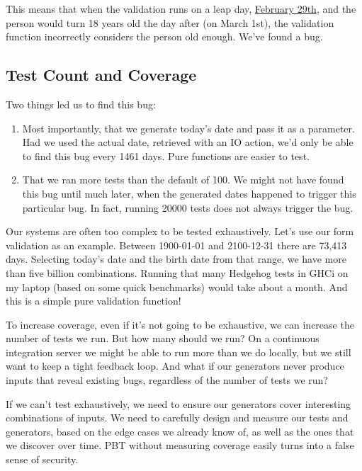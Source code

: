 This means that when the validation runs on a leap day,
\href{https://en.wikipedia.org/wiki/February_29\#Born_on_February_29}{February
29th}, and the person would turn 18 years old the day after (on March
1st), the validation function incorrectly considers the person old
enough. We've found a bug.

\subsection{Test Count and Coverage}\label{test-count-and-coverage}

Two things led us to find this bug:

\begin{enumerate}
\item
  Most importantly, that we generate today's date and pass it as a
  parameter. Had we used the actual date, retrieved with an IO action,
  we'd only be able to find this bug every 1461 days. Pure functions are
  easier to test.
\item
  That we ran more tests than the default of 100. We might not have
  found this bug until much later, when the generated dates happened to
  trigger this particular bug. In fact, running 20000 tests does not
  always trigger the bug.
\end{enumerate}
Our systems are often too complex to be tested exhaustively. Let's use
our form validation as an example. Between 1900-01-01 and 2100-12-31
there are 73,413 days. Selecting today's date and the birth date from
that range, we have more than five billion combinations. Running that
many Hedgehog tests in GHCi on my laptop (based on some quick
benchmarks) would take about a month. And this is a simple pure
validation function!

To increase coverage, even if it's not going to be exhaustive, we can
increase the number of tests we run. But how many should we run? On a
continuous integration server we might be able to run more than we do
locally, but we still want to keep a tight feedback loop. And what if
our generators never produce inputs that reveal existing bugs,
regardless of the number of tests we run?

If we can't test exhaustively, we need to ensure our generators cover
interesting combinations of inputs. We need to carefully design and
measure our tests and generators, based on the edge cases we already
know of, as well as the ones that we discover over time. PBT without
measuring coverage easily turns into a false sense of security.

